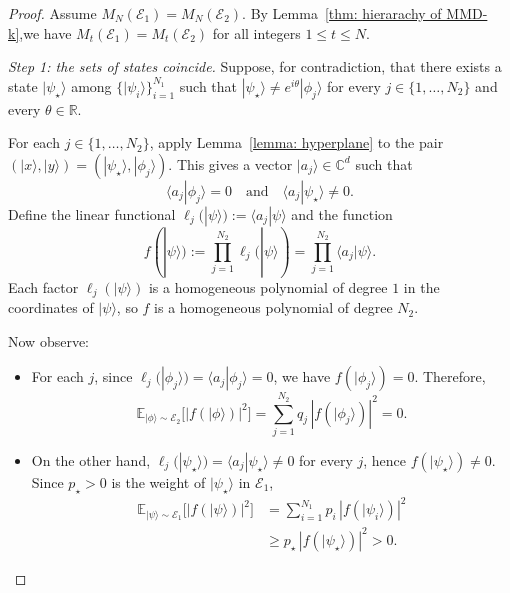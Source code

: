 \documentclass[10pt,a4paper]{amsart}
\newcommand{\Abs}[1]{\left\lvert #1\right\rvert}
\providecommand{\ket}[1]{|#1 \rangle}
\providecommand{\braket}[2]{\langle #1|#2 \rangle}
\newcommand{\dsE}{\mathbb{E}}
\theoremstyle{plain}
\theoremstyle{definition}
\theoremstyle{remark}
\begin{document}
\begin{proof}
Assume $M_N(\mathcal E_1)=M_N(\mathcal E_2)$. By Lemma~\ref{thm: hierarachy of MMD-k},we have $M_t(\mathcal E_1)=M_t(\mathcal E_2)$ for all integers $1\le t\le N$.

\medskip
\noindent\textit{Step 1: the sets of states coincide.}
Suppose, for contradiction, that there exists a state $\ket{\psi_\star}$ among $\{\ket{\psi_i}\}_{i=1}^{N_1}$
such that $\ket{\psi_\star}\neq e^{i\theta}\ket{\phi_j}$ for every $j\in\{1,\dots,N_2\}$ and every $\theta\in\mathbb R$.

For each $j\in\{1,\dots,N_2\}$, apply Lemma~\ref{lemma: hyperplane}
to the pair $(\ket{x},\ket{y})=(\ket{\psi_\star},\ket{\phi_j})$. This gives a vector $\ket{a_j}\in\mathbb C^d$ such that
\[
\braket{a_j}{\phi_j}=0
\quad\text{and}\quad
\braket{a_j}{\psi_\star}\neq 0.
\]
Define the linear functional $\ell_j(\ket{\psi}) := \braket{a_j}{\psi}$ and the function
\begin{equation}
f(\ket{\psi}) := \prod_{j=1}^{N_2} \ell_j(\ket{\psi})
= \prod_{j=1}^{N_2} \braket{a_j}{\psi}.
\label{eq:app-support-separating-polynomial}
\end{equation}
Each factor $\ell_j(\ket{\psi})$ is a homogeneous polynomial of degree $1$ in the coordinates of $\ket{\psi}$,
so $f$ is a homogeneous polynomial of degree $N_2$.

Now observe:
\begin{itemize}
\item For each $j$, since $\ell_j(\ket{\phi_j})=\braket{a_j}{\phi_j}=0$, we have $f(\ket{\phi_j})=0$.
Therefore,
\[ 
\dsE_{\ket{\phi}\sim\mathcal E_2}\!\big[\Abs{f(\ket{\phi})}^2\big]
= \sum_{j=1}^{N_2} q_j\,\Abs{f(\ket{\phi_j})}^2
=0.
\]
\item On the other hand, $\ell_j(\ket{\psi_\star})=\braket{a_j}{\psi_\star}\neq 0$ for every $j$, hence
$f(\ket{\psi_\star})\neq 0$. Since $p_\star>0$ is the weight of $\ket{\psi_\star}$ in $\mathcal E_1$,
\[
\begin{aligned}
\dsE_{\ket{\psi}\sim\mathcal E_1}\!\big[\Abs{f(\ket{\psi})}^2\big]
&= \sum_{i=1}^{N_1} p_i\,\Abs{f(\ket{\psi_i})}^2\\
&\ge p_\star\,\Abs{f(\ket{\psi_\star})}^2
>0.
\end{aligned}
\]
\end{itemize}


\end{proof}
\end{document}
